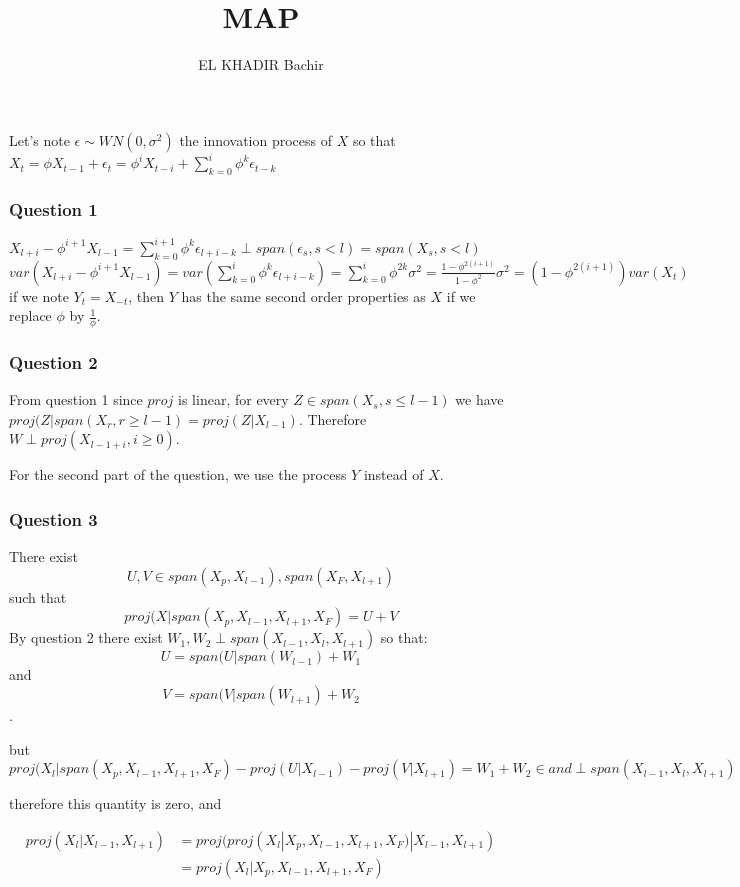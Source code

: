 \documentclass{article}
\newcommand{\Q}[1]{\subsubsection*{Question #1}}
\begin{document}
\title{MAP}
\author{EL KHADIR Bachir}


\maketitle


Let's note $\epsilon \sim WN(0, \sigma^2)$ the innovation process of $X$ so that $X_t = \phi X_{t-1} + \epsilon_t = \phi^i X_{t-i} + \sum_{k=0}^i \phi^k \epsilon_{t-k}$

\Q{1}
$X_{l+i} - \phi^{i+1}X_{l-1} = \sum_{k=0}^{i+1} \phi^k \epsilon_{l+i-k} \perp span(\epsilon_s, s < l) = span(X_s, s < l)$ \\
$var(X_{l+i} - \phi^{i+1}X_{l-1}) = var(\sum_{k=0}^{i} \phi^k \epsilon_{l+i-k}) = \sum_{k=0}^{i} \phi^{2k} \sigma^2 = \frac{1-\phi^{2(i+1)}}{1-\phi^2} \sigma^2 = (1-\phi^{2(i+1)}) var(X_t)$ \\
if we note $Y_t = X_{-t}$, then $Y$ has the same second order properties as $X$ if we replace $\phi$ by $\frac{1}{\phi}$.

\Q{2}
From question 1 since $proj$ is linear, for every $Z \in span(X_s, s \leq l-1)$ we have $proj(Z | span(X_r, r \geq l-1) = proj(Z | X_{l-1})$.
Therefore $W \perp proj(X_{l-1+i}, i \geq 0)$.

For the second part of the question, we use the process $Y$ instead of $X$.

\Q{3}
There exist $$U, V \in span(X_p, X_{l-1}), span(X_F, X_{l+1})$$
such that $$proj(X|span(X_p, X_{l-1}, X_{l+1}, X_F) = U + V$$
By question 2 there exist $W_1, W_2 \perp span(X_{l-1}, X_l, X_{l+1})$ so that:
$$U = span(U|span(W_{l-1}) + W_1$$ and
$$V = span(V|span(W_{l+1}) + W_2$$ .

but $proj(X_l|span(X_p, X_{l-1}, X_{l+1}, X_F) - proj(U|X_{l-1}) - proj(V|X_{l+1}) = W_1 + W_2 \in and \perp span(X_{l-1}, X_l, X_{l+1})$

therefore this quantity is zero, and


\begin{align*}
  proj(X_l | X_{l-1}, X_{l+1}) &= proj(proj(X_l| X_p, X_{l-1}, X_{l+1}, X_F) | X_{l-1}, X_{l+1}) \\
&= proj(X_l| X_p, X_{l-1}, X_{l+1}, X_F)
\end{align*}
  
\end{document}

